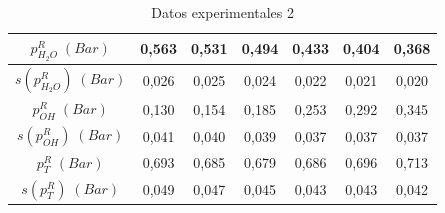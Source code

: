 \documentclass[a4paper,12pt,titlepage]{article}
\begin{document}
\begin{table}[h!]
\begin{tabular}{|c|c|c|c|c|c|c|}
$p_{H_2O}^R \;(Bar)$         & 0,563  & 0,531  & 0,494  & 0,433  & 0,404  & 0,368  \\ \hline
$s(p_{H_2O}^R) \;(Bar)$      & 0,026  & 0,025  & 0,024  & 0,022  & 0,021  & 0,020  \\ \hline
$p_{OH}^R \;(Bar)$           & 0,130  & 0,154  & 0,185  & 0,253  & 0,292  & 0,345  \\ \hline
$s(p_{OH}^R) \;(Bar)$        & 0,041  & 0,040  & 0,039  & 0,037  & 0,037  & 0,037  \\ \hline
$p_{T}^R \;(Bar)$            & 0,693  & 0,685  & 0,679  & 0,686  & 0,696  & 0,713  \\ \hline
$s(p_{T}^R) \;(Bar)$         & 0,049  & 0,047  & 0,045  & 0,043  & 0,043  & 0,042  \\ \hline
\end{tabular}
\caption{Datos experimentales 2}
\label{tab:my-table}
\end{table}

\newpage
\end{document}
